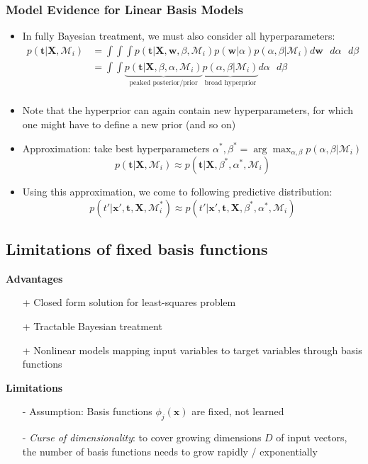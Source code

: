 \subsubsection{Model Evidence for Linear Basis Models}
\begin{itemize}
	\item In fully Bayesian treatment, we must also consider all hyperparameters:
	\begin{equation*}
		\begin{split}
			p\left(\bm{t}|\bm{X}, \mathcal{M}_i\right) & =\int\int\int p\left(\bm{t}|\bm{X},\bm{w},\beta,\mathcal{M}_i\right)p\left(\bm{w}|\alpha\right)p\left(\alpha, \beta | \mathcal{M}_i\right)d\bm{w}\text{ }d\alpha\text{ }d\beta\\
			& = \int\int \underbrace{p\left(\bm{t}|\bm{X}, \beta, \alpha, \mathcal{M}_i\right)}_{\text{peaked posterior/prior}} \underbrace{p\left(\alpha, \beta | \mathcal{M}_i\right)}_{\text{broad hyperprior}} d\alpha \text{ }d\beta\\
		\end{split}
	\end{equation*}
	\item Note that the hyperprior can again contain new hyperparameters, for which one might have to define a new prior (and so on)
	\item Approximation: take best hyperparameters $\alpha^*, \beta^* = \arg\max_{\alpha, \beta} p\left(\alpha, \beta | \mathcal{M}_i\right)$
	$$p\left(\bm{t}|\bm{X}, \mathcal{M}_i\right) \approx p\left(\bm{t}|\bm{X}, \beta^*, \alpha^*, \mathcal{M}_i\right)$$
	\item Using this approximation, we come to following predictive distribution:
	$$p\left(t'|\bm{x}',\bm{t}, \bm{X}, \mathcal{M}_i^*\right) \approx p\left(t'|\bm{x}',\bm{t}, \bm{X}, \beta^*, \alpha^*, \mathcal{M}_i\right)$$
\end{itemize}
\subsection{Limitations of fixed basis functions}
\textbf{Advantages}
\begin{itemize}
	\item[+] Closed form solution for least-squares problem 
	\item[+] Tractable Bayesian treatment
	\item[+] Nonlinear models mapping input variables to target variables through basis functions
\end{itemize}
\textbf{Limitations}
\begin{itemize}
	\item[-] Assumption: Basis functions $\phi_j(\bm{x})$ are fixed, not learned
	\item[-] \textit{Curse of dimensionality}: to cover growing dimensions $D$ of input vectors, the number of basis functions needs to grow rapidly / exponentially
\end{itemize}